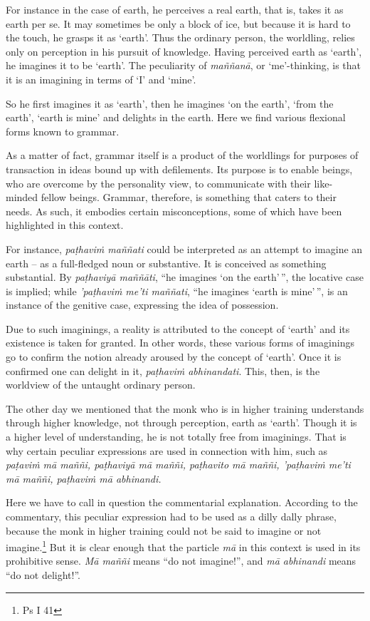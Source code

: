 For instance in the case of earth, he perceives a real earth, that is, takes it as earth per se. It may sometimes be only a block of ice, but because it is hard to the touch, he grasps it as `earth'. Thus the ordinary person, the worldling, relies only on perception in his pursuit of knowledge. Having perceived earth as `earth', he imagines it to be `earth'. The peculiarity of \emph{maññanā}, or `me'-thinking, is that it is an imagining in terms of `I' and `mine'.

So he first imagines it as `earth', then he imagines `on the earth', `from the earth', `earth is mine' and delights in the earth. Here we find various flexional forms known to grammar.

As a matter of fact, grammar itself is a product of the worldlings for purposes of transaction in ideas bound up with defilements. Its purpose is to enable beings, who are overcome by the personality view, to communicate with their like-minded fellow beings. Grammar, therefore, is something that caters to their needs. As such, it embodies certain misconceptions, some of which have been highlighted in this context.

For instance, \emph{paṭhaviṁ maññati} could be interpreted as an attempt to imagine an earth -- as a full-fledged noun or substantive. It is conceived as something substantial. By \emph{paṭhaviyā maññāti}, ``he imagines `on the earth'\,'', the locative case is implied; while \emph{'paṭhaviṁ me'ti maññati}, ``he imagines `earth is mine'\,'', is an instance of the genitive case, expressing the idea of possession.

Due to such imaginings, a reality is attributed to the concept of `earth' and its existence is taken for granted. In other words, these various forms of imaginings go to confirm the notion already aroused by the concept of `earth'. Once it is confirmed one can delight in it, \emph{paṭhaviṁ abhinandati}. This, then, is the worldview of the untaught ordinary person.

The other day we mentioned that the monk who is in higher training understands through higher knowledge, not through perception, earth as `earth'. Though it is a higher level of understanding, he is not totally free from imaginings. That is why certain peculiar expressions are used in connection with him, such as \emph{paṭaviṁ mā maññi, paṭhaviyā mā maññi, paṭhavito mā maññi, 'paṭhaviṁ me'ti mā maññi, paṭhaviṁ mā abhinandi.}

Here we have to call in question the commentarial explanation. According to the commentary, this peculiar expression had to be used as a dilly dally phrase, because the monk in higher training could not be said to imagine or not imagine.\footnote{Ps I 41} But it is clear enough that the particle \emph{mā} in this context is used in its prohibitive sense. \emph{Mā maññi} means ``do not imagine!'', and \emph{mā abhinandi} means ``do not delight!''.

